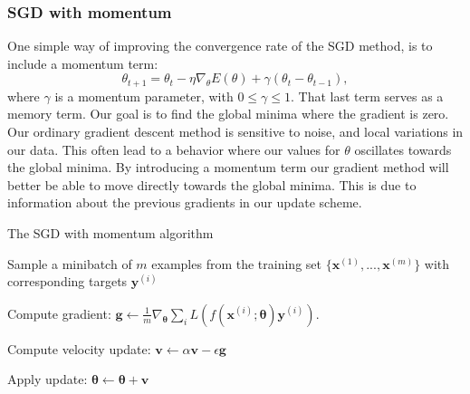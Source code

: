 \subsubsection{SGD with momentum}
One simple way of improving the convergence rate of the SGD method, is to
include a momentum term: 
\begin{equation*}
    \theta _{t+1} = \theta _t - \eta \nabla_\theta E(\theta )+\gamma (\theta_t
    -\theta_{t-1}     ) ,
\end{equation*}
where $\gamma $ is a momentum parameter, with $0\leq \gamma \leq1$. That last
term serves as a memory term. Our goal is to find the
global minima where the gradient is zero. Our ordinary gradient descent method
is sensitive to noise, and local variations in our data.
This often lead to a behavior where our values for $\theta $ oscillates
towards the global minima. %
By introducing a momentum term our gradient method will better be able to move
directly towards the global minima. This is due to information about the previous
gradients in our update scheme.     

\begin{algorithm}
\caption{The SGD with momentum algorithm}\label{alg:SGD_momentum}
\begin{algorithmic}


         Sample a minibatch of $m$ examples from the training set
        $\{\boldsymbol{x}^{(1)}, ..., \boldsymbol{x}^{(m)}\}$ with corresponding
        targets $\boldsymbol{y}^{(i)}$
        
        Compute gradient: $\boldsymbol{g} \gets
        \frac{1}{m}\nabla_{\boldsymbol\theta}
        \sum_{i}L(f(\boldsymbol{x}^{(i)};\boldsymbol{\theta})\boldsymbol{y}^{(i)})$.
        
        Compute velocity update: $\boldsymbol{v} \gets \alpha\boldsymbol{v} -
        \epsilon\boldsymbol{g}$

        Apply update: $\boldsymbol{\theta} \gets
        \boldsymbol{\theta}+\boldsymbol{v}$
    \EndWhile
\end{algorithmic}
\end{algorithm}




